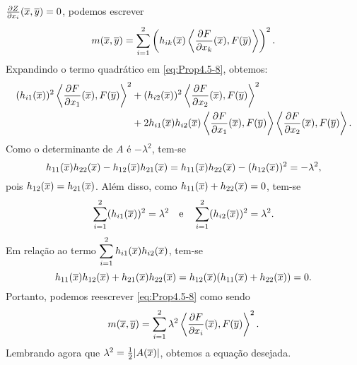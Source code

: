 \begin{demonstracao}
$\frac{\partial Z}{\partial x_i}(\overline{x},\overline{y})=0$, podemos escrever
\begin{eqnarray} \label{eq:Prop4.5-8}
m(\overline{x},\overline{y}) = \sum_{i=1}^2 \left( h_{ik}(\overline{x}) 
\left\langle \frac{\partial F}{\partial x_k}(\overline{x}), F(\overline{y}) \right\rangle \right)^2.
\end{eqnarray}	
Expandindo o termo quadr\'atico em \eqref{eq:Prop4.5-8}, obtemos:
\begin{eqnarray*}
\begin{aligned}
(h_{i1}(\overline{x}))^2 \left\langle \frac{\partial F}{\partial x_1}(\overline{x}), F(\overline{y})\right\rangle^2 
&+ 
(h_{i2}(\overline{x}))^2 \left\langle \frac{\partial F}{\partial x_2}(\overline{x}),F(\overline{y})\right\rangle^2 \\
&+ 
2 h_{i1}(\overline{x}) h_{i2}(\overline{x}) \left\langle \frac{\partial F}
{\partial x_1}(\overline{x}), F(\overline{y}) \right\rangle \left\langle 
\frac{\partial F}{\partial x_2}(\overline{x}), F(\overline{y}) \right\rangle.
\end{aligned}
\end{eqnarray*}	
Como o determinante de $A$ \'e $-\lambda^2$, tem-se
\begin{equation*}
h_{11}(\overline{x}) h_{22}(\overline{x}) - h_{12}(\overline{x}) h_{21}(\overline{x}) = h_{11}(\overline{x}) h_{22}(\overline{x}) - (h_{12}(\overline{x}))^2 = -\lambda^2,
\end{equation*}	
pois $h_{12}(\overline{x}) = h_{21}(\overline{x})$. Al\'em disso, como 
$h_{11}(\overline{x}) + h_{22}(\overline{x}) = 0$, tem-se
\[
\sum_{i=1}^2 (h_{i1}(\overline{x}))^2 = \lambda^2 \quad\mbox{e}\quad
\sum_{i=1}^2 (h_{i2}(\overline{x}))^2 = \lambda^2.
\]
Em rela\c c\~ao ao termo $\displaystyle\sum_{i=1}^2 h_{i1}(\overline{x}) h_{i2}(\overline{x})$,
tem-se
\begin{equation*}
h_{11}(\overline{x}) h_{12}(\overline{x}) + h_{21}(\overline{x}) h_{22}(\overline{x}) = h_{12}(\overline{x}) (h_{11}(\overline{x}) + h_{22}(\overline{x})) = 0.
\end{equation*}	
Portanto, podemos reescrever \eqref{eq:Prop4.5-8} como sendo
\begin{equation*}
m(\overline{x},\overline{y}) = \sum_{i=1}^2 \lambda^2 \left\langle 
\frac{\partial F}{\partial x_i}(\overline{x}), F(\overline{y}) \right\rangle^2.
\end{equation*}	
Lembrando agora que $\lambda^2 = \frac{1}{2} |A(\overline{x})|$, obtemos
a equação desejada.
\end{demonstracao}


